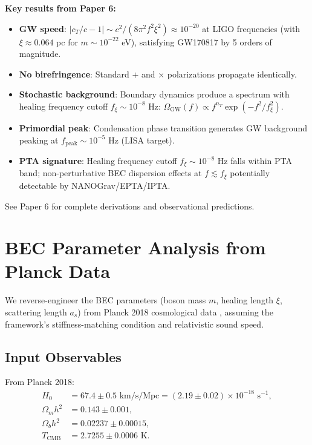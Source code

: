 \documentclass[11pt,a4paper]{article}
\theoremstyle{definition}
\theoremstyle{remark}
\begin{document}
\textbf{Key results from Paper 6:}
\begin{itemize}[leftmargin=*, itemsep=0.2em]
\item \textbf{GW speed}: $|c_T/c - 1| \sim c^2/(8\pi^2 f^2 \xi^2) \approx 10^{-20}$ at LIGO frequencies (with $\xi \approx 0.064$ pc for $m \sim 10^{-22}$ eV), satisfying GW170817 by 5 orders of magnitude.
\item \textbf{No birefringence}: Standard $+$ and $\times$ polarizations propagate identically.
\item \textbf{Stochastic background}: Boundary dynamics produce a spectrum with healing frequency cutoff $f_\xi \sim 10^{-8}$ Hz: $\Omega_{\mathrm{GW}}(f) \propto f^{n_T} \exp(-f^2/f_\xi^2)$.
\item \textbf{Primordial peak}: Condensation phase transition generates GW background peaking at $f_{\mathrm{peak}} \sim 10^{-5}$ Hz (LISA target).
\item \textbf{PTA signature}: Healing frequency cutoff $f_\xi \sim 10^{-8}$ Hz falls within PTA band; non-perturbative BEC dispersion effects at $f \lesssim f_\xi$ potentially detectable by NANOGrav/EPTA/IPTA.
\end{itemize}

See Paper 6 for complete derivations and observational predictions.

\section{BEC Parameter Analysis from Planck Data}
\label{app:bec_params}

We reverse-engineer the BEC parameters (boson mass $m$, healing length $\xi$, scattering length $a_s$) from Planck 2018 cosmological data \cite{Planck2018}, assuming the framework's stiffness-matching condition and relativistic sound speed.

\subsection{Input Observables}
\label{sec:input_observables}

From Planck 2018:
\begin{align}
H_0 &= 67.4 \pm 0.5 \text{ km/s/Mpc} = (2.19 \pm 0.02) \times 10^{-18} \text{ s}^{-1}, \\
\Omega_m h^2 &= 0.143 \pm 0.001, \\
\Omega_b h^2 &= 0.02237 \pm 0.00015, \\
T_{\mathrm{CMB}} &= 2.7255 \pm 0.0006 \text{ K}.
\end{align}
\end{document}
